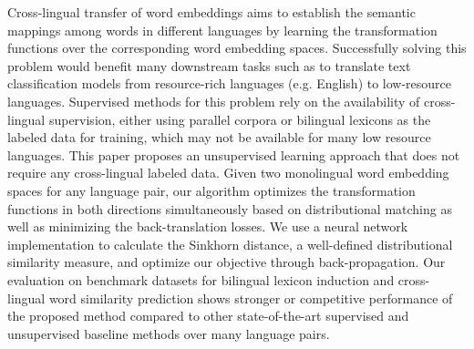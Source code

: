 Cross-lingual transfer of word embeddings aims to establish the semantic mappings among words in different languages by learning the transformation functions over the corresponding word embedding spaces. Successfully solving this problem would benefit many downstream tasks such as to translate text classification models from resource-rich languages (e.g. English) to low-resource languages. Supervised methods for this problem rely on the availability of cross-lingual supervision, either using parallel corpora or bilingual lexicons as the labeled data for training, which may not be available for many low resource languages. This paper proposes an unsupervised learning approach that does not require any cross-lingual labeled data. Given two monolingual word embedding spaces for any language pair, our algorithm optimizes the transformation functions in both directions simultaneously based on distributional matching as well as minimizing the back-translation losses. We use a neural network implementation to calculate the Sinkhorn distance, a well-defined distributional similarity measure, and optimize our objective through back-propagation. Our evaluation on benchmark datasets for bilingual lexicon induction and cross-lingual word similarity prediction shows stronger or competitive performance of the proposed method compared to other state-of-the-art supervised and unsupervised baseline methods over many language pairs.
